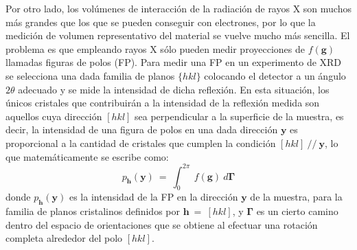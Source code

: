 Por otro lado, los volúmenes de interacción de la radiación de rayos X son muchos más grandes que los que se pueden conseguir con electrones, por lo que la medición de volumen representativo del material se vuelve mucho más sencilla.
El problema es que empleando rayos X sólo pueden medir proyecciones de $f(\mathbf{g})$ llamadas figuras de polos (FP).
Para medir una FP en un experimento de XRD se selecciona una dada familia de planos $\{hkl\}$ colocando el detector a un ángulo $2\theta$ adecuado y se mide la intensidad de dicha reflexión.
En esta situación, los únicos cristales que contribuirán a la intensidad de la reflexión medida son aquellos cuya dirección $[hkl]$ sea perpendicular a la superficie de la muestra, es decir, la intensidad de una figura de polos en una dada dirección $\mathbf{y}$ es proporcional a la cantidad de cristales que cumplen la condición $[hkl] \ // \ \mathbf{y}$, lo que matemáticamente se escribe como:
\begin{equation}
  p_{\mathbf{h}}(\mathbf{y}) \ = \ \int_{0}^{2\pi} \ f(\mathbf{g}) \ d\mathbf{\Gamma}
  \label{eq:PDF}
\end{equation}
\noindent
donde $p_{\mathbf{h}}(\mathbf{y})$ es la intensidad de la FP en la dirección $\mathbf{y}$ de la muestra, para la familia de planos cristalinos definidos por $\mathbf{h} \ = \ [hkl]$, y $\mathbf{\Gamma}$ es un cierto camino dentro del espacio de orientaciones que se obtiene al efectuar una rotación completa alrededor del polo $[hkl]$.

